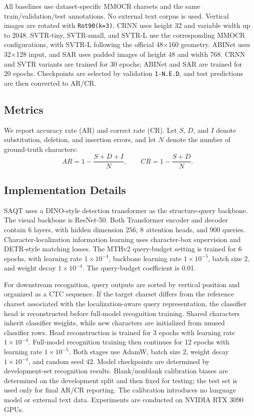 All baselines use dataset-specific MMOCR charsets and the same train/validation/test annotations. No external text corpus is used. Vertical images are rotated with \texttt{Rot90(k=3)}. CRNN uses height 32 and variable width up to 2048. SVTR-tiny, SVTR-small, and SVTR-L use the corresponding MMOCR configurations, with SVTR-L following the official 48$\times$160 geometry. ABINet uses 32$\times$128 input, and SAR uses padded images of height 48 and width 768. CRNN and SVTR variants are trained for 30 epochs; ABINet and SAR are trained for 20 epochs. Checkpoints are selected by validation \texttt{1-N.E.D}, and test predictions are then converted to AR/CR.

\subsection{Metrics}

We report accuracy rate (AR) and correct rate (CR). Let $S$, $D$, and $I$ denote substitution, deletion, and insertion errors, and let $N$ denote the number of ground-truth characters:
\begin{equation}
AR=1-\frac{S+D+I}{N},\qquad
CR=1-\frac{S+D}{N}.
\end{equation}

\subsection{Implementation Details}

SAQT uses a DINO-style detection transformer as the structure-query backbone. The visual backbone is ResNet-50. Both Transformer encoder and decoder contain 6 layers, with hidden dimension 256, 8 attention heads, and 900 queries. Character-localization information learning uses character-box supervision and DETR-style matching losses. The MTHv2 query-budget setting is trained for 6 epochs, with learning rate $1\times 10^{-4}$, backbone learning rate $1\times 10^{-5}$, batch size 2, and weight decay $1\times 10^{-4}$. The query-budget coefficient is 0.01.

For downstream recognition, query outputs are sorted by vertical position and organized as a CTC sequence. If the target charset differs from the reference charset associated with the localization-aware query representation, the classifier head is reconstructed before full-model recognition training. Shared characters inherit classifier weights, while new characters are initialized from unused classifier rows. Head reconstruction is trained for 3 epochs with learning rate $1\times 10^{-4}$. Full-model recognition training then continues for 12 epochs with learning rate $1\times 10^{-5}$. Both stages use AdamW, batch size 2, weight decay $1\times 10^{-4}$, and random seed 42. Model checkpoints are determined by development-set recognition results. Blank/nonblank calibration biases are determined on the development split and then fixed for testing; the test set is used only for final AR/CR reporting. The calibration introduces no language model or external text data. Experiments are conducted on NVIDIA RTX 3090 GPUs.
